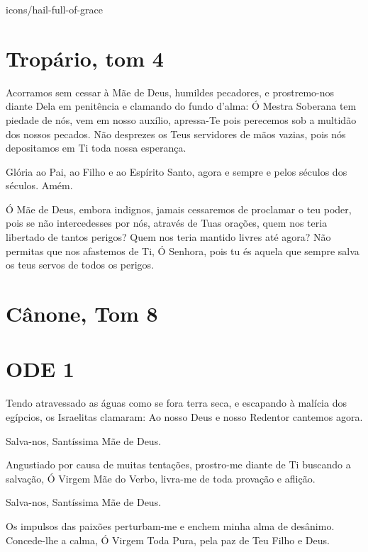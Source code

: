 \documentclass{subfiles}
\begin{document}
\begin{chapterimg}[width=\textwidth]{icons/hail-full-of-grace}
\end{chapterimg}

\section*{Tropário, tom 4}

Acorramos sem cessar à Mãe de Deus, humildes pecadores, e prostremo-nos diante
Dela em penitência e clamando do fundo d'alma: Ó Mestra Soberana tem piedade de
nós, vem em nosso auxílio, apressa-Te pois perecemos sob a multidão dos nossos
pecados. Não desprezes os Teus servidores de mãos vazias, pois nós depositamos
em Ti toda nossa esperança. 

Glória ao Pai, ao Filho e ao Espírito Santo, agora e sempre e pelos
séculos dos séculos. Amém.

Ó Mãe de Deus, embora indignos, jamais cessaremos de proclamar o
teu poder, pois se não intercedesses por nós, através de Tuas orações, quem
nos teria libertado de tantos perigos? Quem nos teria mantido livres até
agora? Não permitas que nos afastemos de Ti, Ó Senhora, pois tu és aquela
que sempre salva os teus servos de todos os perigos.

\section*{Cânone, Tom 8}

\section*{ODE 1}

\eirmos{}Tendo atravessado as águas como se fora terra seca, e
escapando à malícia dos egípcios, os Israelitas clamaram: Ao nosso Deus e
nosso Redentor cantemos agora.

Salva-nos, Santíssima Mãe de Deus.

Angustiado por causa de muitas tentações, prostro-me diante de Ti
buscando a salvação, Ó Virgem Mãe do Verbo, livra-me de toda provação e
aflição.

Salva-nos, Santíssima Mãe de Deus.

Os impulsos das paixões perturbam-me e enchem minha alma de
desânimo. Concede-lhe a calma, Ó Virgem Toda Pura, pela paz de Teu Filho e
Deus.
\end{document}

